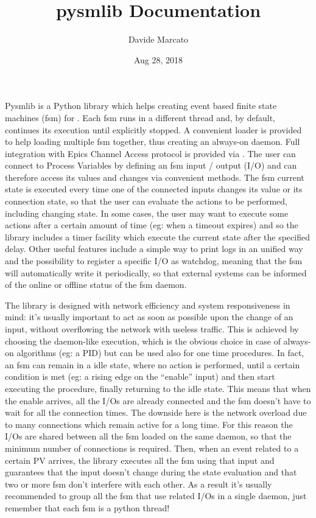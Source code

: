 \documentclass[letterpaper,10pt,english]{sphinxmanual}
\title{pysmlib Documentation}
\date{Aug 28, 2018}
\author{Davide Marcato}
\begin{document}
\maketitle
\sphinxtableofcontents
{}\label{\detokenize{index::doc}}


Pysmlib is a Python library which helps creating event based finite state machines
(fsm) for . Each fsm
runs in a different thread and, by default, continues its execution until explicitly
stopped. A convenient loader is provided to help loading multiple fsm together,
thus creating an always-on daemon. Full integration with Epics Channel Access
protocol is provided via .
The user can connect to Process Variables by defining an fsm input / output (I/O)
and can therefore access its values and changes via convenient methods. The fsm
current state is executed every time one of the connected inputs changes its value
or its connection state, so that the user can evaluate the actions to be
performed, including changing state. In some cases, the user may want to execute
some actions after a certain amount of time (eg: when a timeout expires) and so
the library includes a timer facility which execute the current state after the
specified delay. Other useful features include a simple way to print logs in an
unified way and the possibility to register a specific I/O as watchdog, meaning
that the fsm will automatically write it periodically, so that external systems
can be informed of the online or offline status of the fsm daemon.

The library is designed with network efficiency and system responsiveness
in mind: it’s usually important to act as soon as possible upon the change of an
input, without overflowing the network with useless traffic. This is achieved
by choosing the daemon-like execution, which is the obvious choice in
case of always-on algorithms (eg: a PID) but can be used also for one time
procedures. In fact, an fsm can remain in a idle state, where no action is
performed, until a certain condition is met (eg: a rising edge on the “enable”
input) and then start executing the procedure, finally returning to the idle
state. This means that when the enable arrives, all the I/Os are already
connected and the fsm doesn’t have to wait for all the connection times. The
downside here is the network overload due to many connections which remain active
for a long time. For this reason the I/Os are shared between all the fsm loaded
on the same daemon, so that the minimum number of connections is required. Then,
when an event related to a certain PV arrives, the library executes all the fsm
using that input and guarantees that the input doesn’t change during the state
evaluation and that two or more fsm don’t interfere with each other. As a
result it’s usually recommended to group all the fsm that use related I/Os
in a single daemon, just remember that each fsm is a python thread!
\end{document}
